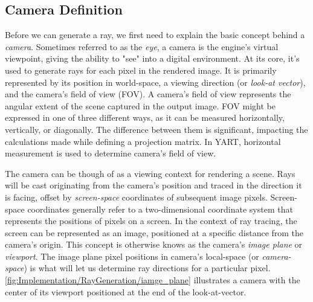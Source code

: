 \subsection{Camera Definition}

Before we can generate a ray, we first need to explain the basic concept behind a \textit{camera}.
Sometimes referred to as the \textit{eye}, a camera is the engine's virtual viewpoint, giving the ability to "see" into a digital environment.
At its core, it's used to generate rays for each pixel in the rendered image.
It is primarily represented by its position in world-space, a viewing direction (or \textit{look-at vector}), and the camera's field of view (FOV).
A camera's field of view represents the angular extent of the scene captured in the output image. 
FOV might be expressed in one of three different ways, as it can be measured horizontally, vertically, or diagonally.
The difference between them is significant, impacting the calculations made while defining a projection matrix.
In YART, horizontal measurement is used to determine camera's field of view.

The camera can be though of as a viewing context for rendering a scene.
Rays will be cast originating from the camera's position and traced in the direction it is facing, offset by \textit{screen-space} coordinates of subsequent image pixels.
Screen-space coordinates generally refer to a two-dimensional coordinate system that represents the positions of pixels on a screen.
In the context of ray tracing, the screen can be represented as an image, positioned at a specific distance from the camera's origin. 
This concept is otherwise knows as the camera's \textit{image plane} or \textit{viewport}.
The image plane pixel positions in camera's local-space (or \textit{camera-space}) is what will let us determine ray directions for a particular pixel. 
\cref{fig:Implementation/RayGeneration/iamge_plane} illustrates a camera with the center of its viewport positioned at the end of the look-at-vector.  

